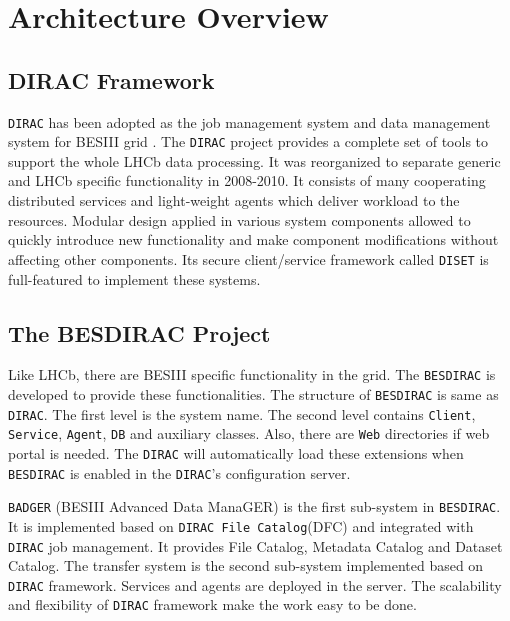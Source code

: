 \section{Architecture Overview}

\subsection{DIRAC Framework}

{\tt DIRAC} \cite{bib:dirac3} 
has been adopted as the job management system and data management
system for BESIII grid \cite{bib:besdfc}. 
The {\tt DIRAC} project provides a 
complete set of tools to support the whole LHCb data processing.
It was reorganized to separate generic and LHCb specific functionality
in 2008-2010.
%
It consists of many cooperating distributed services and light-weight
agents which deliver workload to the resources.
Modular design applied in various system components allowed to quickly
introduce new functionality and make component modifications without
affecting other components.
Its secure client/service framework called {\tt DISET} \cite{bib:diset} 
is full-featured to implement these systems.

\subsection{The BESDIRAC Project}

Like LHCb, there are BESIII specific functionality in the grid.
The {\tt BESDIRAC} \cite{bib:besdirac} 
is developed to provide these functionalities.
The structure of {\tt BESDIRAC} is same as {\tt DIRAC}.
The first level is the system name. The second level contains
{\tt Client}, {\tt Service}, {\tt Agent}, {\tt DB} and auxiliary classes.
Also, there are {\tt Web} directories if web portal is needed.
The {\tt DIRAC} will automatically load these extensions when 
{\tt BESDIRAC} is enabled in the {\tt DIRAC}'s configuration server.

{\tt BADGER} (BESIII Advanced Data ManaGER) is the first sub-system
in {\tt BESDIRAC}. It is implemented based on {\tt DIRAC File Catalog}(DFC)
and integrated with {\tt DIRAC} job management.
It provides File Catalog, Metadata Catalog and Dataset Catalog.
%
The transfer system is the second sub-system implemented based on
{\tt DIRAC} framework. Services and agents are deployed in the server.
The scalability and flexibility of {\tt DIRAC} framework make the work
easy to be done. 

